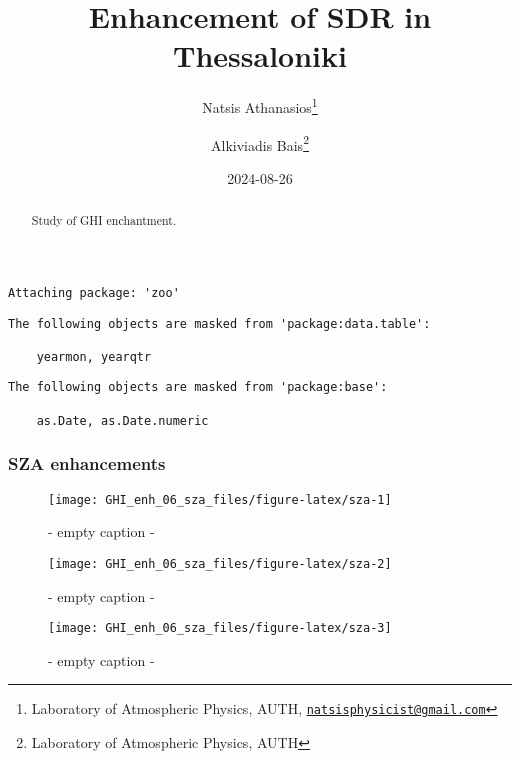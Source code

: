 \documentclass[
  10pt,
  a4paper,oneside]{article}
\title{Enhancement of SDR in Thessaloniki}
\author{Natsis Athanasios\footnote{Laboratory of Atmospheric Physics, AUTH, \href{mailto:natsisphysicist@gmail.com}{\nolinkurl{natsisphysicist@gmail.com}}} \and Alkiviadis Bais\footnote{Laboratory of Atmospheric Physics, AUTH}}
\date{2024-08-26}
\begin{document}
\maketitle
\begin{abstract}
Study of GHI enchantment.
\end{abstract}

{
\hypersetup{linkcolor=}
\setcounter{tocdepth}{4}
\tableofcontents
}
\begin{verbatim}
Attaching package: 'zoo'
\end{verbatim}

\begin{verbatim}
The following objects are masked from 'package:data.table':

    yearmon, yearqtr
\end{verbatim}

\begin{verbatim}
The following objects are masked from 'package:base':

    as.Date, as.Date.numeric
\end{verbatim}

\newpage
\FloatBarrier

\hypertarget{sza-enhancements}{%
\subsubsection{SZA enhancements}\label{sza-enhancements}}

\begin{figure}[H]

{\centering \texttt{[image: GHI\_enh\_06\_sza\_files/figure-latex/sza-1]} 

}

\caption{ - empty caption - }\label{fig:sza-1}
\end{figure}
\begin{figure}[H]

{\centering \texttt{[image: GHI\_enh\_06\_sza\_files/figure-latex/sza-2]} 

}

\caption{ - empty caption - }\label{fig:sza-2}
\end{figure}
\begin{figure}[H]

{\centering \texttt{[image: GHI\_enh\_06\_sza\_files/figure-latex/sza-3]} 

}

\caption{ - empty caption - }\label{fig:sza-3}
\end{figure}
\end{document}
